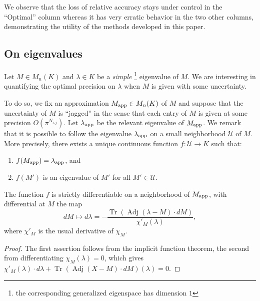 \documentclass{sig-alternate-05-2015}
\DeclareMathOperator{\tr}{Tr}
\DeclareMathOperator{\adj}{Adj}
\newcommand{\calU}{\mathcal{U}}
\newcommand{\app}{\text{\rm app}}
\begin{document}
We observe that the loss of relative accuracy stays under control in the 
``Optimal'' column whereas it has very erratic behavior in the two other columns,
demonstrating the utility of the methods developed in this paper.

\subsection{On eigenvalues}
\label{ssec:eigenvalues}

Let $M \in M_n(K)$ and $\lambda \in K$ be a \emph{simple}
\footnote{the corresponding generalized eigenspace has dimension $1$} eigenvalue 
of $M$. We are interesting in quantifying the optimal precision on 
$\lambda$ when $M$ is given with some uncertainty.

To do so, we fix an approximation $M_\app \in M_n(K)$ of $M$ and 
suppose that the uncertainty of $M$ is ``jagged'' in the sense that
each entry of $M$ is given at some precision $O(\pi^{N_{i,j}})$.
Let $\lambda_\app$ be the relevant eigenvalue of $M_\app$. We remark 
that it is possible to follow the eigenvalue $\lambda_\app$ on a small 
neighborhood $\calU$ of $M$. More precisely, there exists a unique continuous 
function $f : \calU \to K$ such that:
\begin{enumerate}[$\bullet$]
\renewcommand{\itemsep}{0pt}
\item $f(M_\app) = \lambda_\app$, and
\item $f(M')$ is an eigenvalue of $M'$ for all $M' \in \calU$.
\end{enumerate}

\begin{lem}
The function $f$ is strictly differentiable on a neighborhood of 
$M_\app$, with differential at $M$ the map
\[
dM \mapsto d \lambda = - \frac{\tr(\adj(\lambda-M) \cdot dM)}
{\chi'_M(\lambda)},
\]
where $\chi'_M$ is the usual derivative of $\chi_M$.
\end{lem}

\begin{proof}
The first assertion follows from the implicit function theorem,
the second from differentiating $\chi_M(\lambda) = 0$, which gives
$\chi'_M(\lambda) \cdot d \lambda + \tr(\adj(X-M) \cdot dM)(\lambda) = 0$.
\end{proof}
\end{document}
